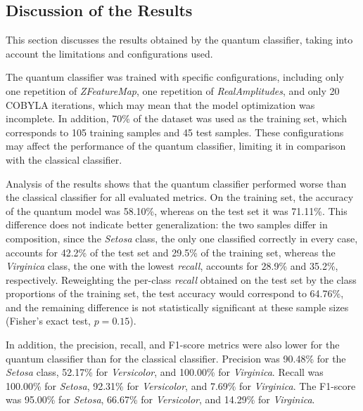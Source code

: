 
\subsection{Discussion of the Results}

This section discusses the results obtained by the quantum classifier, taking into account the limitations and configurations used.

The quantum classifier was trained with specific configurations, including only one repetition of \textit{ZFeatureMap}, one repetition of \textit{RealAmplitudes}, and only 20 COBYLA iterations, which may mean that the model optimization was incomplete. In addition, 70\% of the dataset was used as the training set, which corresponds to 105 training samples and 45 test samples. These configurations may affect the performance of the quantum classifier, limiting it in comparison with the classical classifier.

Analysis of the results shows that the quantum classifier performed worse than the classical classifier for all evaluated metrics. On the training set, the accuracy of the quantum model was 58.10\%, whereas on the test set it was 71.11\%. This difference does not indicate better generalization: the two samples differ in composition, since the \textit{Setosa} class, the only one classified correctly in every case, accounts for 42.2\% of the test set and 29.5\% of the training set, whereas the \textit{Virginica} class, the one with the lowest \textit{recall}, accounts for 28.9\% and 35.2\%, respectively. Reweighting the per-class \textit{recall} obtained on the test set by the class proportions of the training set, the test accuracy would correspond to 64.76\%, and the remaining difference is not statistically significant at these sample sizes (Fisher's exact test, $p = 0.15$).

In addition, the precision, recall, and F1-score metrics were also lower for the quantum classifier than for the classical classifier. Precision was 90.48\% for the \textit{Setosa} class, 52.17\% for \textit{Versicolor}, and 100.00\% for \textit{Virginica}. Recall was 100.00\% for \textit{Setosa}, 92.31\% for \textit{Versicolor}, and 7.69\% for \textit{Virginica}. The F1-score was 95.00\% for \textit{Setosa}, 66.67\% for \textit{Versicolor}, and 14.29\% for \textit{Virginica}.

